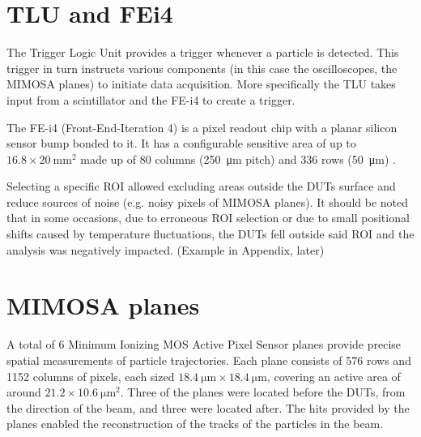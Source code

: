 

\section{TLU and FEi4}

The Trigger Logic Unit provides a trigger whenever a particle is detected. This trigger in turn instructs various components (in this case the oscilloscopes, the MIMOSA planes) to initiate data acquisition. More specifically the TLU takes input from a scintillator and the FE-i4 to create a trigger.

The FE-i4 (Front-End-Iteration 4) is a pixel readout chip with a planar silicon sensor bump bonded to it. It has a configurable sensitive area of up to $\num{16.8} \times \qty{20}{\milli\meter^2}$ made up of 80 columns (\qty{250}{\micro\meter} pitch) and 336 rows (\qty{50}{\micro\meter}) \cite{Obermann:2014goa}. 

Selecting a specific ROI allowed excluding areas outside the DUTs surface and reduce sources of noise (e.g. noisy pixels of MIMOSA planes). It should be noted that in some occasions, due to erroneous ROI selection or due to small positional shifts caused by temperature fluctuations, the DUTs fell outside said ROI and the analysis was negatively impacted. (Example in Appendix, later)
 
\section{MIMOSA planes}

A total of 6 Minimum Ionizing MOS Active Pixel Sensor planes provide precise spatial measurements of particle trajectories. Each plane consists of 576 rows and 1152 columns of pixels, each sized $\qty{18.4}{\micro\meter} \times \qty{18.4}{\micro\meter}$, covering an active area of around $\num{21.2} \times \qty{10.6}{\micro\meter^2}$. Three of the planes were located before the DUTs, from the direction of the beam, and three were located after. The hits provided by the planes enabled the reconstruction of the tracks of the particles in the beam.


